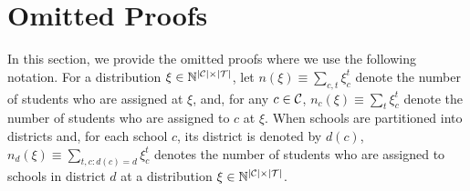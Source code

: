 \documentclass[12pt]{amsart}
\theoremstyle{remark}
\def\T{\mathcal{T}} \def\calt{\mathcal{T}}
\newcommand{\ieh}[1]{{\color{orange} IEH: #1 }}
\newcommand{\mby}[1]{{\color{blue} MBY: #1 }}
\begin{document}
\section{Omitted Proofs}\label{sec:proofs}
In this section, we provide the omitted proofs where we use the following notation. For a distribution $\xi \in \mathbb N^{|\C|\times |\T|}$, let
$n(\xi) \equiv \sum_{c,t} \xi_c^t$
denote the number of students who are assigned at $\xi$, and,  for any $c \in \mathcal{C}$,
$n_c(\xi) \equiv \sum_{t} \xi_c^t$
denote the number of students who are assigned to $c$ at $\xi$. When schools are partitioned into districts and, for each school $c$, its
district is denoted by $d(c)$,
$n_d(\xi) \equiv \sum_{t,c:d(c)=d} \xi_c^t$
denotes the number of students who are assigned to schools in district $d$ at a distribution
$\xi \in \mathbb N^{|\C|\times |\T|}$.%
\end{document}
